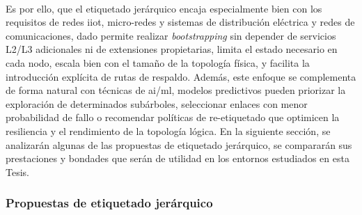 \\
Es por ello, que el etiquetado jerárquico encaja especialmente bien con los requisitos de redes \gls{iiot}, micro-redes y sistemas de distribución eléctrica y redes de comunicaciones, dado permite realizar \textit{bootstrapping} sin depender de servicios L2/L3 adicionales ni de extensiones propietarias, limita el estado necesario en cada nodo, escala bien con el tamaño de la topología física, y facilita la introducción explícita de rutas de respaldo. Además, este enfoque se complementa de forma natural con técnicas de \gls{ai}/\gls{ml}, modelos predictivos pueden priorizar la exploración de determinados subárboles, seleccionar enlaces con menor probabilidad de fallo o recomendar políticas de re-etiquetado que optimicen la resiliencia y el rendimiento de la topología lógica. En la siguiente sección, se analizarán algunas de las propuestas de etiquetado jerárquico, se compararán sus prestaciones y bondades que serán de utilidad en los entornos estudiados en esta Tesis.

 

\subsubsection{Propuestas de etiquetado jerárquico}
\label{subsubsec:propuestas_etiquetado}

